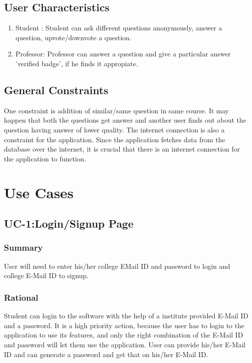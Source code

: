 \documentclass[journal,12pt,onecolumn,draftclsnofoot,]{IEEEtran}
\begin{document}
\subsection{User Characteristics}
\begin{enumerate}
\item Student : Student can ask different questions anonymously, answer a question, upvote/downvote a question.
\item Professor: Professor can answer a question and  give a particular answer 'verified badge', if he finds it appropiate.
\end{enumerate} 

\subsection{General Constraints}
One constraint is addition of similar/same question in same course. It may happen that both the questions get answer and another user finds out about the question having answer of lower quality. The internet connection is also a constraint for the application. Since the application fetches data from the database over the internet, it is crucial that there is an internet connection for the application to function. 

\section{Use Cases}

\subsection{UC-1:Login/Signup Page}
\subsubsection{Summary}
User will need to enter his/her college EMail ID and password to login and college E-Mail ID to signup.
\subsubsection{Rational}
Student can login to the software with the help of a institute provided E-Mail ID and a password. It is a high priority action, because the user has to login to the application to use its features, and only the right combination
of the E-Mail ID and password will let them use the application. User can provide his/her E-Mail ID and can generate a password and get that on his/her E-Mail ID.
\end{document}
